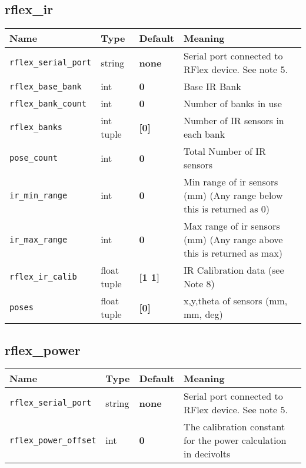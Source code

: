 \subsection*{rflex\_ir}
\begin{center}
{\small \begin{tabular}{|l|l|l|l|}
\hline
Name & Type & Default & Meaning\\
\hline
{\tt rflex\_serial\_port} & string & {\bf none} & Serial port connected to RFlex device. See note 5.\\
{\tt rflex\_base\_bank} & int & {\bf 0} & Base IR Bank\\
{\tt rflex\_bank\_count} & int & {\bf 0} & Number of banks in use\\
{\tt rflex\_banks} & int tuple & {\bf [0]} & Number of IR sensors in each bank\\
{\tt pose\_count} & int & {\bf 0} & Total Number of IR sensors\\
{\tt ir\_min\_range} & int & {\bf 0} & Min range of ir sensors (mm) (Any range below this is returned as 0)\\
{\tt ir\_max\_range} & int & {\bf 0} & Max range of ir sensors (mm) (Any range above this is returned as max)\\
{\tt rflex\_ir\_calib} & float tuple & {\bf [1 1]} & IR Calibration data (see Note 8)\\
{\tt poses} & float tuple & {\bf [0]} & x,y,theta of sensors (mm, mm, deg)\\
\hline
\end{tabular}}
\end{center}

\subsection*{rflex\_power}
\begin{center}
{\small \begin{tabular}{|l|l|l|l|}
\hline
Name & Type & Default & Meaning\\
\hline
{\tt rflex\_serial\_port} & string & {\bf none} & Serial port connected to RFlex device. See note 5.\\
{\tt rflex\_power\_offset} & int & {\bf 0} & The calibration constant for the power calculation in decivolts\\
\hline
\end{tabular}}
\end{center}


